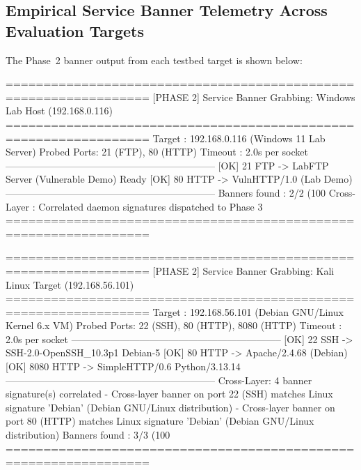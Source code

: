 \FloatBarrier
\subsection{Empirical Service Banner Telemetry Across Evaluation Targets}
The Phase~2 banner output from each testbed target is shown below:

\begin{logbox}
=================================================================
  [PHASE 2] Service Banner Grabbing: Windows Lab Host (192.168.0.116)
=================================================================
  Target      : 192.168.0.116 (Windows 11 Lab Server)
  Probed Ports: 21 (FTP), 80 (HTTP)
  Timeout     : 2.0s per socket
-----------------------------------------------------------------
  [OK]    21  FTP      -> LabFTP Server (Vulnerable Demo) Ready
  [OK]    80  HTTP     -> VulnHTTP/1.0 (Lab Demo)
-----------------------------------------------------------------
  Banners found : 2/2 (100%
  Cross-Layer   : Correlated daemon signatures dispatched to Phase 3
=================================================================

=================================================================
  [PHASE 2] Service Banner Grabbing: Kali Linux Target (192.168.56.101)
=================================================================
  Target      : 192.168.56.101 (Debian GNU/Linux Kernel 6.x VM)
  Probed Ports: 22 (SSH), 80 (HTTP), 8080 (HTTP)
  Timeout     : 2.0s per socket
-----------------------------------------------------------------
  [OK]    22  SSH      -> SSH-2.0-OpenSSH_10.3p1 Debian-5
  [OK]    80  HTTP     -> Apache/2.4.68 (Debian)
  [OK]  8080  HTTP     -> SimpleHTTP/0.6 Python/3.13.14
-----------------------------------------------------------------
  Cross-Layer: 4 banner signature(s) correlated
    - Cross-layer banner on port 22 (SSH) matches Linux signature 'Debian' (Debian GNU/Linux distribution)
    - Cross-layer banner on port 80 (HTTP) matches Linux signature 'Debian' (Debian GNU/Linux distribution)
  Banners found : 3/3 (100%
=================================================================
\end{logbox}

